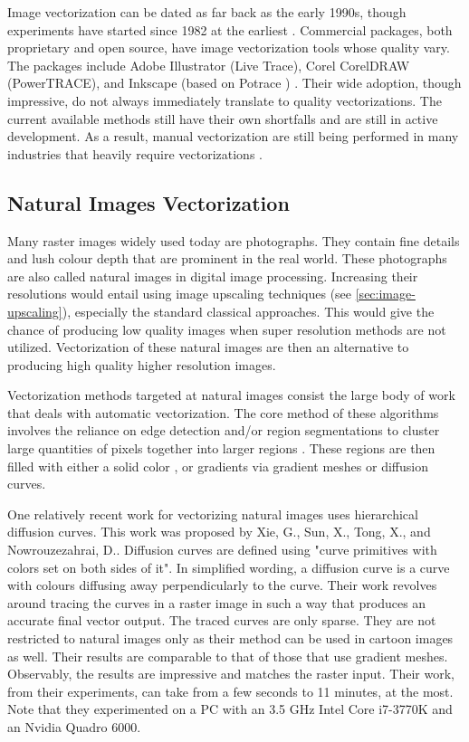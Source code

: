 Image vectorization can be dated as far back as the early 1990s, though experiments have started since 1982 at the earliest \cite{somexperimentsvectorization}. Commercial packages, both proprietary and open source, have image vectorization tools whose quality vary. The packages include Adobe Illustrator (Live Trace), Corel CorelDRAW (PowerTRACE), and Inkscape (based on Potrace \cite{inkscapepotrace}) \cite{hoshyari2018perceptiondriven}. Their wide adoption, though impressive, do not always immediately translate to quality vectorizations. The current available methods still have their own shortfalls and are still in active development. As a result, manual vectorization are still being performed in many industries that heavily require vectorizations \cite{vectorizationoflinedrawingspolyvector}.

\subsection{Natural Images Vectorization}
Many raster images widely used today are photographs. They contain fine details and lush colour depth that are prominent in the real world. These photographs are also called natural images in digital image processing. Increasing their resolutions would entail using image upscaling techniques (see \ref{sec:image-upscaling}), especially the standard classical approaches. This would give the chance of producing low quality images \cite{depixelizingpixelart} when super resolution methods are not utilized. Vectorization of these natural images are then an alternative to producing high quality higher resolution images.

Vectorization methods targeted at natural images consist the large body of work that deals with automatic vectorization. The core method of these algorithms involves the reliance on edge detection and/or region segmentations to cluster large quantities of pixels together into larger regions \cite{depixelizingpixelart}. These regions are then filled with either a solid color \cite{anovelmethodforvectorization}, or gradients via gradient meshes \cite{optimizedgradientmeshes}\cite{barendrecht2018locally} or diffusion curves\cite{hierarchicaldiffusioncurves}.

One relatively recent work for vectorizing natural images uses hierarchical diffusion curves. This work was proposed by Xie, G., Sun, X., Tong, X., and Nowrouzezahrai, D.. Diffusion curves are defined using "curve primitives with colors set on both sides of it". In simplified wording, a diffusion curve is a curve with colours diffusing away perpendicularly to the curve. Their work revolves around tracing the curves in a raster image in such a way that produces an accurate final vector output. The traced curves are only sparse. They are not restricted to natural images only as their method can be used in cartoon images as well. Their results are comparable to that of those that use gradient meshes. Observably, the results are impressive and matches the raster input. Their work, from their experiments, can take from a few seconds to 11 minutes, at the most. Note that they experimented on a PC with an 3.5 GHz Intel Core i7-3770K and an Nvidia Quadro 6000.

